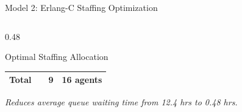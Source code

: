 \documentclass[10pt,aspectratio=169]{beamer}
\begin{document}
\begin{frame}{Model 2: Erlang-C Staffing Optimization}
\begin{columns}[c]
\begin{column}{0.48\textwidth}
\begin{block}{Optimal Staffing Allocation}
\begin{tabular}{lccc}
                    \midrule
                    \textbf{Total} & & \textbf{9} & \textbf{16 agents} \\
                    \bottomrule
                \end{tabular}
                \vspace{0.15cm}
            \end{block}
            \vspace{0.1cm}
            \centering
            \footnotesize \textit{Reduces average queue waiting time from 12.4 hrs to 0.48 hrs.}
        \end{column}
    \end{columns}
\end{frame}

\end{document}
